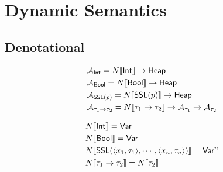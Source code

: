 \section{Dynamic Semantics}

\subsection{Denotational}
\begin{align*}
  &\typesem{\Int} = \namesem{\Int} \ra \Heap
  \\
  &\typesem{\Bool} = \namesem{\Bool} \ra \Heap
  \\
  &\typesem{\SSL(p)} = \namesem{\SSL(p)} \ra \Heap
  \\
  &\typesem{\tau_1 \ra \tau_2} = \namesem{\tau_1 \ra \tau_2} \ra \typesem{\tau_1} \ra \typesem{\tau_2}
\end{align*}

\begin{align*}
  &\namesem{\Int} = \Var
  \\
  &\namesem{\Bool} = \Var
  \\
  &\namesem{\SSL(\langle x_1, \tau_1 \rangle, \cdots, \langle x_n, \tau_n \rangle)} = \Var^n
  \\
  &\namesem{\tau_1 \ra \tau_2} = \namesem{\tau_2}
\end{align*}
\\

